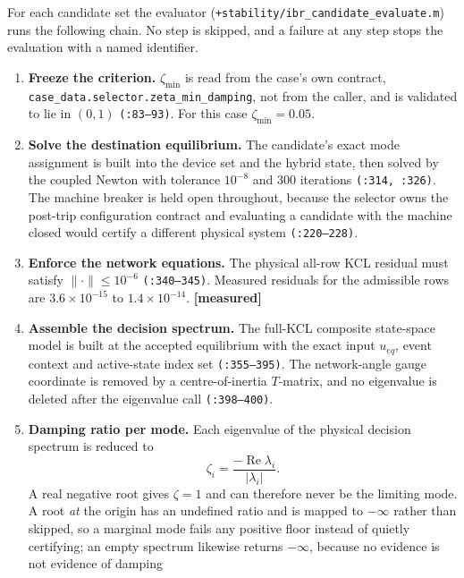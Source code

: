 \documentclass[12pt,a4paper]{article}
\theoremstyle{remark}
\newcommand{\zmin}{\zeta_{\min}}
\newcommand{\code}[1]{\texttt{\small #1}}
\newcommand{\measured}{\textcolor{ok}{\textbf{[measured]}}}
\begin{document}
For each candidate set the evaluator
(\code{+stability/ibr\_candidate\_evaluate.m}) runs the following chain. No step
is skipped, and a failure at any step stops the evaluation with a named
identifier.

\begin{enumerate}[leftmargin=1.7em,itemsep=3pt]
\item \textbf{Freeze the criterion.} $\zmin$ is read from the case's own
      contract, \code{case\_data.selector.zeta\_min\_damping}, not from the
      caller, and is validated to lie in $(0,1)$ \code{(:83--93)}. For this case
      $\zmin = 0.05$.
\item \textbf{Solve the destination equilibrium.} The candidate's exact mode
      assignment is built into the device set and the hybrid state, then solved
      by the coupled Newton with tolerance $10^{-8}$ and 300 iterations
      \code{(:314, :326)}. The machine breaker is held open throughout, because
      the selector owns the post-trip configuration contract and evaluating a
      candidate with the machine closed would certify a different physical
      system \code{(:220--228)}.
\item \textbf{Enforce the network equations.} The physical all-row KCL residual
      must satisfy $\lVert \cdot\rVert \le 10^{-6}$
      \code{(:340--345)}. Measured residuals for the admissible rows are
      $3.6\times10^{-15}$ to $1.4\times10^{-14}$. \measured
\item \textbf{Assemble the decision spectrum.} The full-KCL composite
      state-space model is built at the accepted equilibrium with the exact
      input $u_{eq}$, event context and active-state index set \code{(:355--395)}.
      The network-angle gauge coordinate is removed by a centre-of-inertia
      $T$-matrix, and no eigenvalue is deleted after the eigenvalue call
      \code{(:398--400)}.
\item \textbf{Damping ratio per mode.} Each eigenvalue of the physical decision
      spectrum is reduced to
      \begin{equation}
      \zeta_i = \frac{-\operatorname{Re}\lambda_i}{|\lambda_i|}.
      \label{eq:zeta}
      \end{equation}
      A real negative root gives $\zeta = 1$ and can therefore never be the
      limiting mode. A root \emph{at} the origin has an undefined ratio and is
      mapped to $-\infty$ rather than skipped, so a marginal mode fails any
      positive floor instead of quietly certifying; an empty spectrum likewise
      returns $-\infty$, because no evidence is not evidence of damping

\end{enumerate}
\end{document}
